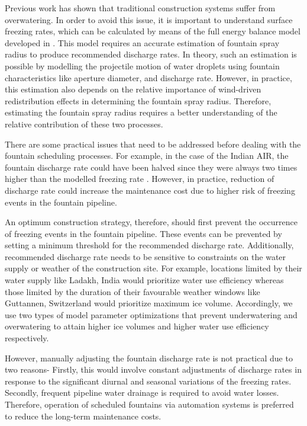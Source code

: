 \documentclass[tc, manuscript]{copernicus}
\begin{document}
Previous work \citep{balasubramanianInfluenceMeteorologicalConditions2022} has shown that traditional
construction systems suffer from overwatering. In order to avoid this issue, it is important to understand
surface freezing rates, which can be calculated by means of the full energy balance model developed in
\cite{balasubramanianInfluenceMeteorologicalConditions2022}. This model requires an accurate estimation of
fountain spray radius to produce recommended discharge rates. In theory, such an estimation is possible by
modelling the projectile motion of water droplets using fountain characteristics like aperture diameter, and
discharge rate. However, in practice, this estimation also depends on the relative importance of wind-driven
redistribution effects in determining the fountain spray radius. Therefore, estimating the fountain spray radius
requires a better understanding of the relative contribution of these two processes.

There are some practical issues that need to be addressed before dealing with the fountain scheduling processes.
For example, in the case of the Indian AIR, the fountain discharge rate could have been halved since they were
always two times higher than the modelled freezing rate
\citep{balasubramanianInfluenceMeteorologicalConditions2022}. However, in practice, reduction of discharge rate
could increase the maintenance cost due to higher risk of freezing events in the fountain pipeline.

An optimum construction strategy, therefore, should first prevent the occurrence of freezing events in the
fountain pipeline. These events can be prevented by setting a minimum threshold for the recommended discharge
rate. Additionally, recommended discharge rate needs to be sensitive to constraints on the water supply or
weather of the construction site. For example, locations limited by their water supply like Ladakh, India
would prioritize water use efficiency whereas those limited by the duration of their favourable weather windows
like Guttannen, Switzerland would prioritize maximum ice volume. Accordingly, we use two types of model
parameter optimizations that prevent underwatering and overwatering to attain higher ice volumes and higher
water use efficiency respectively.

However, manually adjusting the fountain discharge rate is not practical due to two reasons- Firstly, this would
involve constant adjustments of discharge rates in response to the significant diurnal and seasonal variations
of the freezing rates. Secondly, frequent pipeline water drainage is required to avoid water losses. Therefore,
operation of scheduled fountains via automation systems is preferred to reduce the long-term maintenance costs.
\end{document}

